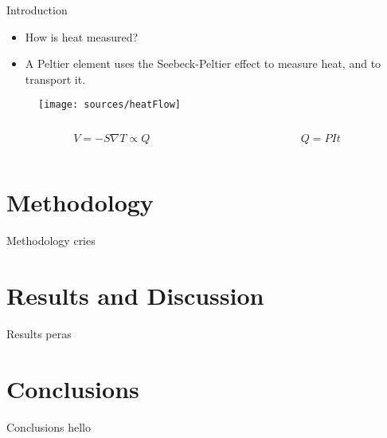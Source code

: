 \documentclass[handout]{beamer}
\begin{document}
\begin{frame}{Introduction}
	\begin{itemize}
		\item How is heat measured?
		\item A Peltier element uses the Seebeck-Peltier effect to measure heat, and to transport it.
	\end{itemize}
	\begin{figure}[h]
		\centering
		\texttt{[image: sources/heatFlow]}
	\end{figure}
	\begin{columns}
		\begin{column}{0.5\textwidth}
			\begin{equation}
				V = -S\nabla T \propto Q
			\end{equation}
		\end{column}
		\begin{column}{0.5\textwidth}
			\begin{equation}
				Q = PIt
			\end{equation}
		\end{column}
	\end{columns}
\end{frame}

\section{Methodology}
\begin{frame}{Methodology}
	cries
\end{frame}

\section{Results and Discussion}
\begin{frame}{Results}
	peras
\end{frame}

\section{Conclusions}
\begin{frame}{Conclusions}
	hello
\end{frame}
\end{document}
